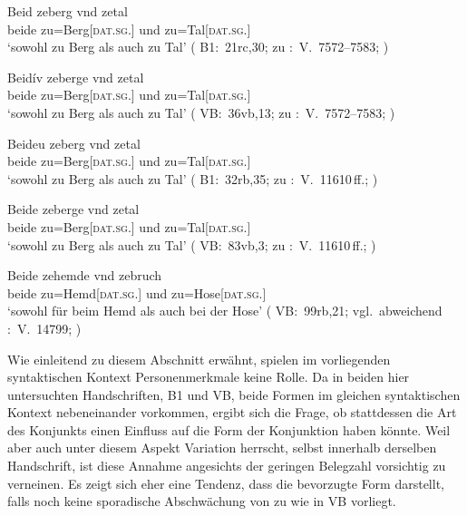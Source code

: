 \begin{exe}
\ex \label{ex:syntintvar2}
\begin{xlist}
	\ex \label{ex:syntintvar2_1}
		\gll Beid zeberg vnd zetal \\
			beide zu=Berg[\textsc{dat.sg.\MascI}] und zu=Tal[\textsc{dat.sg.\NeutI}] \\
		\trans `sowohl zu Berg als auch zu Tal'
			(%
				B1:~21rc,30; zu
				\KC:~V.~7572--7583;
				\cite[220]{schroeder1895}%
			)

	\ex \label{ex:syntintvar2_3}
		\gll Beidív zeberge vnd zetal \\
			beide zu=Berg[\textsc{dat.sg.\MascI}] und zu=Tal[\textsc{dat.sg.\NeutI}] \\
		\trans `sowohl zu Berg als auch zu Tal'
			(%
				VB:~36vb,13; zu
				\KC:~V.~7572--7583;
				\cite[220]{schroeder1895}%
			)
\end{xlist}

\ex \label{ex:syntintvar5}
\begin{xlist}
	\ex \label{ex:syntintvar2_2}
		\gll Beideu zeberg vnd zetal \\
			beide zu=Berg[\textsc{dat.sg.\MascI}] und zu=Tal[\textsc{dat.sg.\NeutI}] \\
		\trans `sowohl zu Berg als auch zu Tal'
			(%
				B1:~32rb,35; zu
				\KC:~V.~11610\,ff.;
				\cite[293]{schroeder1895}%
			)

	\ex \label{ex:syntintvar2_4}
		\gll Beide zeberge vnd zetal \\
			beide zu=Berg[\textsc{dat.sg.\MascI}] und zu=Tal[\textsc{dat.sg.\NeutI}] \\
		\trans `sowohl zu Berg als auch zu Tal'
			(%
				VB:~83vb,3; zu
				\KC:~V.~11610\,ff.;
				\cite[293]{schroeder1895}%
			)
\end{xlist}

\ex \label{ex:syntintvar4}
	\gll Beide zehemde vnd zebruch \\
		beide zu=Hemd[\textsc{dat.sg.\NeutI}] und
			zu=Hose[\textsc{dat.sg.\FemI}] \\
	\trans `sowohl für beim Hemd als auch bei der Hose'
		(%
			VB:~99rb,21; vgl.~abweichend
			\KC:~V.~14799;
			\cite[349]{schroeder1895}%
		)
\end{exe}

Wie einleitend zu diesem Abschnitt erwähnt, spielen im vorliegenden
syntaktischen Kontext Personenmerkmale keine Rolle. Da in beiden hier
untersuchten Handschriften, B1 und VB, beide Formen im gleichen syntaktischen
Kontext nebeneinander vorkommen, ergibt sich die Frage, ob stattdessen die Art
des Konjunkts einen Einfluss auf die Form der Konjunktion haben könnte. Weil
aber auch unter diesem Aspekt Variation herrscht, selbst innerhalb derselben
Handschrift, ist diese Annahme angesichts der geringen Belegzahl vorsichtig zu
verneinen. Es zeigt sich eher eine Tendenz, dass  die bevorzugte
Form darstellt, falls noch keine sporadische Abschwächung von  zu
 wie in VB vorliegt.

